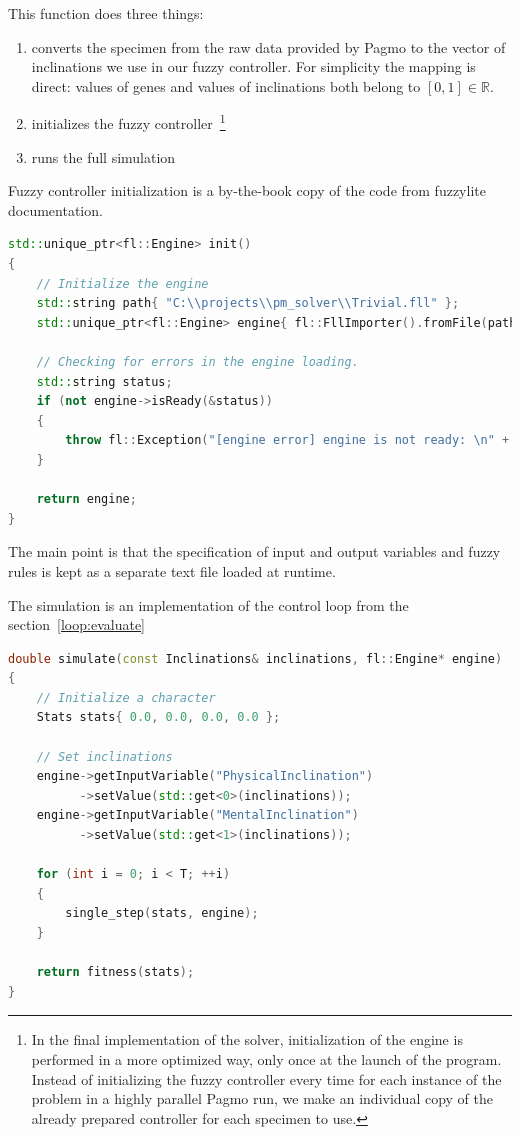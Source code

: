 \documentclass[12pt, a4paper]{report}
\begin{document}
	This function does three things:
	
	\begin{enumerate}
		\item converts the specimen from the raw data provided by Pagmo to the vector of inclinations we use in our fuzzy controller. For simplicity the mapping is direct: values of genes and values of inclinations both belong to $[0, 1] \in \mathbb{R}$.
		\item initializes the fuzzy controller~\footnote{In the final implementation of the solver, initialization of the engine is performed in a more optimized way, only once at the launch of the program. Instead of initializing the fuzzy controller every time for each instance of the problem in a highly parallel Pagmo run, we make an individual copy of the already prepared controller for each specimen to use.}
		\item runs the full simulation
	\end{enumerate}
	
	Fuzzy controller initialization is a by-the-book copy of the code from fuzzylite documentation.
	
	\begin{lstlisting}[language=c++]
std::unique_ptr<fl::Engine> init()
{
	// Initialize the engine
	std::string path{ "C:\\projects\\pm_solver\\Trivial.fll" };
	std::unique_ptr<fl::Engine> engine{ fl::FllImporter().fromFile(path) };
	
	// Checking for errors in the engine loading.
	std::string status;
	if (not engine->isReady(&status))
	{
		throw fl::Exception("[engine error] engine is not ready: \n" + status);
	}
	
	return engine;
}
	\end{lstlisting}
	
	The main point is that the specification of input and output variables and fuzzy rules is kept as a separate text file loaded at runtime.
	
	The simulation is an implementation of the control loop from the section~\ref{loop:evaluate}
	
	\begin{lstlisting}[language=c++]
double simulate(const Inclinations& inclinations, fl::Engine* engine)
{
	// Initialize a character
	Stats stats{ 0.0, 0.0, 0.0, 0.0 };
	
	// Set inclinations
	engine->getInputVariable("PhysicalInclination")
		  ->setValue(std::get<0>(inclinations));
	engine->getInputVariable("MentalInclination")
	      ->setValue(std::get<1>(inclinations));
	
	for (int i = 0; i < T; ++i)
	{
		single_step(stats, engine);
	}
	
	return fitness(stats);
}
	\end{lstlisting}
	
\end{document}
